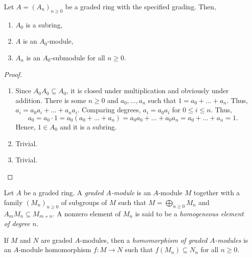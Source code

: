 \begin{proposition}
    Let $A = (A_n)_{n\ge 0}$ be a graded ring with the specified grading. Then, 
    \begin{enumerate}[label=(\alph*)]
        \item $A_0$ is a subring, 
        \item $A$ is an $A_0$-module, 
        \item $A_n$ is an $A_0$-submodule for all $n\ge 0$.
    \end{enumerate}
\end{proposition}
\begin{proof}
\begin{enumerate}[label=(\alph*)]
    \item Since $A_0 A_0\subseteq A_0$, it is closed under multiplication and obviously under addition. There is some $n\ge 0$ and $a_0,\dots,a_n$ such that $1 = a_0 + \dots + a_n$. Thus, $a_i = a_0a_i + \dots + a_na_i$. Comparing degrees, $a_i = a_0a_i$ for $0\le i\le n$. Thus, 
    \begin{equation*}
        a_0 = a_0\cdot 1 = a_0(a_0 + \dots + a_n) = a_0a_0 + \dots + a_0a_n = a_0 + \dots + a_n = 1.
    \end{equation*}
    Hence, $1\in A_0$ and it is a subring.

    \item Trivial.
    \item Trivial.\qedhere
\end{enumerate}
\end{proof}

\begin{definition}
    Let $A$ be a graded ring. A \emph{graded $A$-module} is an $A$-module $M$ together with a family $(M_n)_{n\ge 0}$ of subgroups of $M$ such that $M = \bigoplus_{n\ge 0} M_n$ and $A_m M_n\subseteq M_{m + n}$. A nonzero element of $M_n$ is said to be a \emph{homogeneous element of degree $n$}.
\end{definition}

\begin{definition}
    If $M$ and $N$ are graded $A$-modules, then a \emph{homomorphism of graded $A$-modules} is an $A$-module homomorphism $f: M\to N$ such that $f(M_n)\subseteq N_n$ for all $n\ge 0$.
\end{definition}


